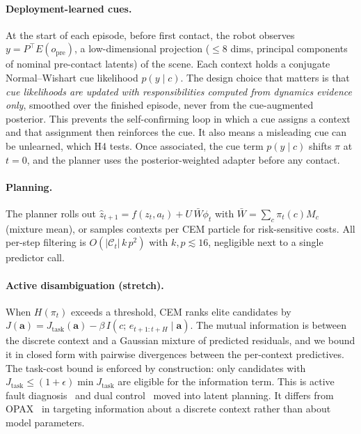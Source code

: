 \documentclass[10pt]{article}
\newcommand{\C}{\mathcal{C}}
\begin{document}
\paragraph{Deployment-learned cues.}
At the start of each episode, before first contact, the robot observes $y=P^\top E(o_{\text{pre}})$, a
low-dimensional projection ($\le 8$ dims, principal components of nominal pre-contact latents) of the
scene. Each context holds a conjugate Normal--Wishart cue likelihood $p(y\mid c)$. The design choice
that matters is that \emph{cue likelihoods are updated with responsibilities computed from dynamics
evidence only}, smoothed over the finished episode, never from the cue-augmented posterior. This
prevents the self-confirming loop in which a cue assigns a context and that assignment then reinforces
the cue. It also means a misleading cue can be unlearned, which H4 tests. Once associated, the cue term
$p(y\mid c)$ shifts $\pi$ at $t=0$, and the planner uses the posterior-weighted adapter before any
contact.

\paragraph{Planning.}
The planner rolls out $\hat z_{t+1}=f(z_t,a_t)+U\,\bar W\phi_t$ with $\bar W=\sum_c\pi_t(c)M_c$ (mixture
mean), or samples contexts per CEM particle for risk-sensitive costs. All per-step filtering is
$O(|\C_t|\,k\,p^2)$ with $k,p\lesssim 16$, negligible next to a single predictor call.

\paragraph{Active disambiguation (stretch).}
When $H(\pi_t)$ exceeds a threshold, CEM ranks elite candidates by
$J(\mathbf a)=J_{\text{task}}(\mathbf a)-\beta\, I(c;\,e_{t+1:t+H}\mid \mathbf a)$. The mutual information
is between the discrete context and a Gaussian mixture of predicted residuals, and we bound it in closed
form with pairwise divergences between the per-context predictives. The task-cost bound is enforced by
construction: only candidates with $J_{\text{task}}\le(1+\epsilon)\min J_{\text{task}}$ are eligible for
the information term. This is active fault diagnosis~\cite{blackmore2006discrimination,
blackmore2008active,simandl2009afd} and dual control~\cite{mesbah2018dual,heirung2019mpcdiscrimination}
moved into latent planning. It differs from OPAX~\cite{sukhija2023opax} in targeting information about
a discrete context rather than about model parameters.
\end{document}
